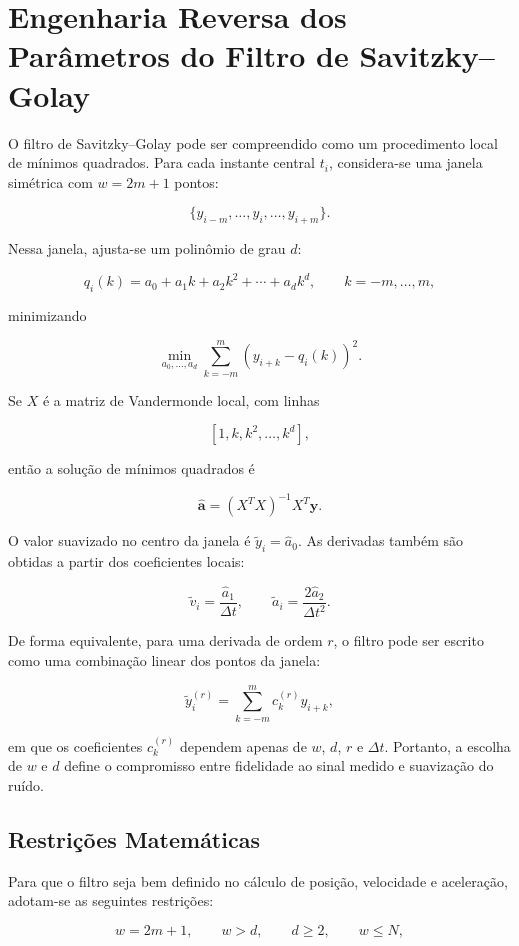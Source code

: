\section{Engenharia Reversa dos Parâmetros do Filtro de Savitzky--Golay}

O filtro de Savitzky--Golay pode ser compreendido como um procedimento local de mínimos quadrados. Para cada instante central $t_i$, considera-se uma janela simétrica com $w=2m+1$ pontos:

\[
    \{y_{i-m},\ldots,y_i,\ldots,y_{i+m}\}.
\]

Nessa janela, ajusta-se um polinômio de grau $d$:

\[
    q_i(k)=a_0+a_1k+a_2k^2+\cdots+a_dk^d,
    \qquad k=-m,\ldots,m,
\]

minimizando

\[
    \min_{a_0,\ldots,a_d}
    \sum_{k=-m}^{m}\left(y_{i+k}-q_i(k)\right)^2.
\]

Se $X$ é a matriz de Vandermonde local, com linhas

\[
    [1,k,k^2,\ldots,k^d],
\]

então a solução de mínimos quadrados é

\[
    \hat{\mathbf{a}}=(X^TX)^{-1}X^T\mathbf{y}.
\]

O valor suavizado no centro da janela é $\tilde{y}_i=\hat{a}_0$. As derivadas também são obtidas a partir dos coeficientes locais:

\[
    \tilde{v}_i=\frac{\hat{a}_1}{\Delta t},
    \qquad
    \tilde{a}_i=\frac{2\hat{a}_2}{\Delta t^2}.
\]

De forma equivalente, para uma derivada de ordem $r$, o filtro pode ser escrito como uma combinação linear dos pontos da janela:

\[
    \tilde{y}^{(r)}_i
    =
    \sum_{k=-m}^{m} c^{(r)}_k y_{i+k},
\]

em que os coeficientes $c^{(r)}_k$ dependem apenas de $w$, $d$, $r$ e $\Delta t$. Portanto, a escolha de $w$ e $d$ define o compromisso entre fidelidade ao sinal medido e suavização do ruído.

\subsection{Restrições Matemáticas}

Para que o filtro seja bem definido no cálculo de posição, velocidade e aceleração, adotam-se as seguintes restrições:

\[
    w=2m+1,\qquad w>d,\qquad d\geq 2,\qquad w\leq N,
\]

